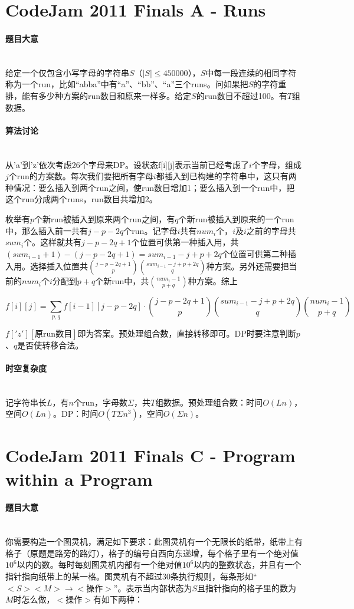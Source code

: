 \documentclass[UTF8]{ctexart}
\newcommand{\myparagraph}[1]{\paragraph{#1}\mbox{}\\}
\theoremstyle{nonumberplain}
\begin{document}
	\section{CodeJam 2011 Finals A - Runs}
	
		\myparagraph{题目大意}
		
			给定一个仅包含小写字母的字符串$S$（$|S| \leq 450000$），$S$中每一段连续的相同字符称为一个run，比如“abba”中有“a”、“bb”、“a”三个runs。问如果把$S$的字符重排，能有多少种方案的run数目和原来一样多。给定$S$的run数目不超过100。有$T$组数据。
		
		\myparagraph{算法讨论}
		
			从'a'到'z'依次考虑26个字母来DP。设状态f[i][j]表示当前已经考虑了$i$个字母，组成$j$个run的方案数。每次我们要把所有字母$i$都插入到已构建的字符串中，这只有两种情况：要么插入到两个run之间，使run数目增加1；要么插入到一个run中，把这个run分成两个runs，run数目共增加2。
			
			枚举有$p$个新run被插入到原来两个run之间，有$q$个新run被插入到原来的一个run中，那么插入前一共有$j-p-2q$个run。记字母$i$共有$num_i$个，$i$及$i$之前的字母共$sum_i$个。这样就共有$j-p-2q+1$个位置可供第一种插入用，共$(sum_{i-1}+1)-(j-p-2q+1)=sum_{i-1}-j+p+2q$个位置可供第二种插入用。选择插入位置共$\binom{j-p-2q+1}{p}\binom{sum_{i-1}-j+p+2q}{q}$种方案。另外还需要把当前的$num_i$个$i$分配到$p+q$个新run中，共$\binom{num_i-1}{p+q}$种方案。综上
			
			$$ f[i][j]=\sum_{p,q} f[i-1][j-p-2q] \cdot \binom{j-p-2q+1}{p}\binom{sum_{i-1}-j+p+2q}{q}\binom{num_i-1}{p+q} $$
			
			$f['z'][\mbox{原run数目}]$即为答案。预处理组合数，直接转移即可。DP时要注意判断$p$、$q$是否使转移合法。
		
		\myparagraph{时空复杂度}
		
			记字符串长$L$，有$n$个run，字母数$\Sigma$，共$T$组数据。预处理组合数：时间$O(Ln)$，空间$O(Ln)$。DP：时间$O(T \Sigma n^3)$，空间$O(\Sigma n)$。
	
	\section{CodeJam 2011 Finals C - Program within a Program}
	
		\myparagraph{题目大意}
		
			你需要构造一个图灵机，满足如下要求：此图灵机有一个无限长的纸带，纸带上有格子（原题是路旁的路灯），格子的编号自西向东递增，每个格子里有一个绝对值$10^6$以内的数。每时每刻图灵机内部有一个绝对值$10^6$以内的整数状态，并且有一个指针指向纸带上的某一格。图灵机有不超过$30$条执行规则，每条形如“$<S> <M> \to <\mbox{操作}>$”。表示当内部状态为$S$且指针指向的格子里的数为$M$时怎么做，$<$操作$>$有如下两种：
			
\end{document}
